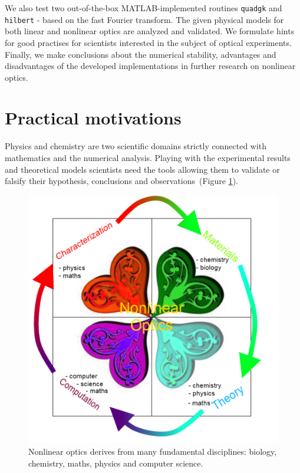 \documentclass[12pt,twoside,a4paper]{article}
\def\emptyline{\vspace{12pt}}
\numberwithin{equation}{subsection}
\numberwithin{figure}{subsection}
\begin{document}
We also test two out-of-the-box MATLAB-implemented routines \texttt{quadgk} and \texttt{hil\-bert} - based on the fast Fourier
transform. The given physical models for both linear and nonlinear optics are analyzed and validated. We formulate hints for good
practises for scientists interested in the subject of optical experiments. Finally, we make conclusions about the numerical stability, advantages
and disadvantages of the developed implementations in further research on nonlinear optics.

\emptyline

\section{Practical motivations} \label{chap:practical_motivations}
Physics and chemistry are two scientific domains strictly connected with mathematics and the numerical analysis. Playing with the
experimental results and theoretical models scientists need the tools allowing them to validate or falsify their hypothesis, conclusions and
observations~(Figure \ref{fig:practical_nlo}).


\begin{figure} 
 \includegraphics{img/nlo.png}
 \caption{Nonlinear optics derives from many fundamental disciplines: biology, chemistry, maths, physics and computer science.
 \label{fig:practical_nlo}}
\end{figure}
\end{document}
